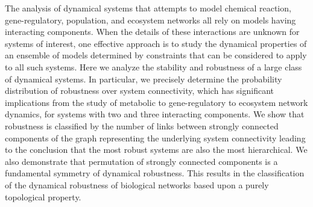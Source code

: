 The analysis of dynamical systems that attempts to model chemical reaction, gene-regulatory, population, and ecosystem networks all rely on models having interacting components. When the details of these interactions are unknown for systems of interest, one effective approach is to study the dynamical properties of an ensemble of models determined by constraints that can be considered to apply to all such systems. Here we analyze the stability and robustness of a large class of dynamical systems. In particular, we precisely determine the probability distribution of robustness over system connectivity, which has significant implications from the study of metabolic to gene-regulatory to ecosystem network dynamics, for systems with two and three interacting components. We show that robustness is classified by the number of links between strongly connected components of the graph representing the underlying system connectivity leading to the conclusion that the most robust systems are also the most hierarchical. We also demonstrate that permutation of strongly connected components is a fundamental symmetry of dynamical robustness. This results in the classification of the dynamical robustness of biological networks based upon a purely topological property.
